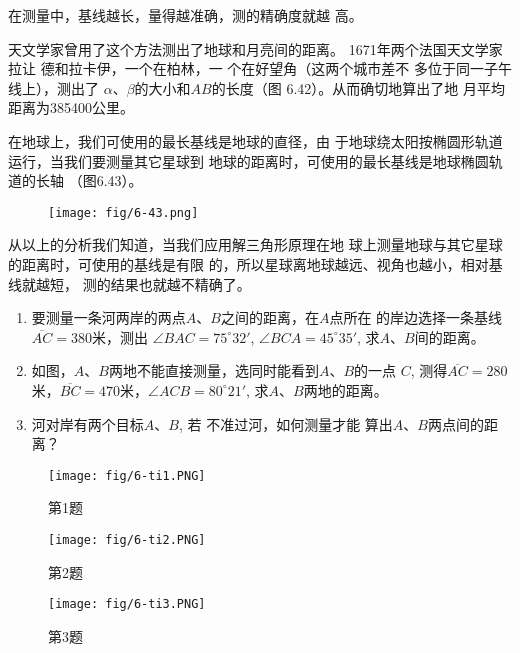 在测量中，基线越长，量得越准确，测的精确度就越
高。

天文学家曾用了这个方法测出了地球和月亮间的距离。
1671年两个法国天文学家拉让
德和拉卡伊，一个在柏林，一
个在好望角（这两个城市差不
多位于同一子午线上），测出了
$\alpha$、$\beta$的大小和$AB$的长度（图
6.42）。从而确切地算出了地
月平均距离为385400公里。

在地球上，我们可使用的最长基线是地球的直径，由
于地球绕太阳按椭圆形轨道运行，当我们要测量其它星球到
地球的距离时，可使用的最长基线是地球椭圆轨道的长轴
（图6.43）。

\begin{figure}[htp]
    \centering
\texttt{[image: fig/6-43.png]}
    \caption{}
\end{figure}

从以上的分析我们知道，当我们应用解三角形原理在地
球上测量地球与其它星球的距离时，可使用的基线是有限
的，所以星球离地球越远、视角也越小，相对基线就越短，
测的结果也就越不精确了。

\begin{ex}
\begin{enumerate}
    \item 要测量一条河两岸的两点$A$、$B$之间的距离，在$A$点所在
    的岸边选择一条基线$\overline{AC}=380$米，测出
    $\angle BAC=75^{\circ}32'$, $\angle BCA=45^{\circ}35'$, 
    求$A$、$B$间的距离。
    \item 如图，$A$、$B$两地不能直接测量，选同时能看到$A$、$B$的一点
    $C$, 测得$\overline{AC}=280$米，$\overline{BC}=470$米，$\angle ACB=80^{\circ}21'$, 
    求$A$、$B$两地的距离。
    \item 河对岸有两个目标$A$、$B$, 若
    不准过河，如何测量才能
    算出$A$、$B$两点间的距离？
\end{enumerate}
\end{ex}

\begin{figure}[htp]\centering
    \begin{minipage}[t]{0.48\textwidth}
    \centering
    \texttt{[image: fig/6-ti1.PNG]}
    \caption*{第1题}
    \end{minipage}
    \begin{minipage}[t]{0.48\textwidth}
    \centering
    \texttt{[image: fig/6-ti2.PNG]}
    \caption*{第2题}
    \end{minipage}
    \end{figure}

    \begin{figure}[htp]
        \centering
    \texttt{[image: fig/6-ti3.PNG]}
        \caption*{第3题}
    \end{figure}

